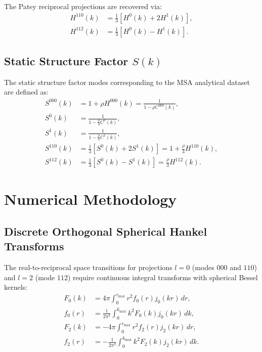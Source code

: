 \documentclass[11pt,a4paper]{article}
\begin{document}
The Patey reciprocal projections are recovered via:
\begin{align}
    H^{110}(k) &= \frac{1}{3} \left[ H^0(k) + 2 H^1(k) \right], \\
    H^{112}(k) &= \frac{1}{3} \left[ H^0(k) - H^1(k) \right].
\end{align}

\subsection{Static Structure Factor \texorpdfstring{$S(k)$}{S(k)}}

The static structure factor modes corresponding to the MSA analytical dataset are defined as:
\begin{align}
    S^{000}(k) &= 1 + \rho H^{000}(k) = \frac{1}{1 - \rho C^{000}(k)}, \\
    S^0(k)     &= \frac{1}{1 - \frac{\rho}{3} C^0(k)}, \\
    S^1(k)     &= \frac{1}{1 - \frac{\rho}{3} C^1(k)}, \\
    S^{110}(k) &= \frac{1}{3} \left[ S^0(k) + 2 S^1(k) \right] = 1 + \frac{\rho}{3} H^{110}(k), \\
    S^{112}(k) &= \frac{1}{3} \left[ S^0(k) - S^1(k) \right] = \frac{\rho}{3} H^{112}(k).
\end{align}

\section{Numerical Methodology}

\subsection{Discrete Orthogonal Spherical Hankel Transforms}

The real-to-reciprocal space transitions for projections $l=0$ (modes $000$ and $110$) and $l=2$ (mode $112$) require continuous integral transforms with spherical Bessel kernels:
\begin{align}
    F_0(k) &= 4\pi \int_0^{r_{\max}} r^2 f_0(r) j_0(kr) \, dr, \\
    f_0(r) &= \frac{1}{2\pi^2} \int_0^{k_{\max}} k^2 F_0(k) j_0(kr) \, dk, \\
    F_2(k) &= -4\pi \int_0^{r_{\max}} r^2 f_2(r) j_2(kr) \, dr, \\
    f_2(r) &= -\frac{1}{2\pi^2} \int_0^{k_{\max}} k^2 F_2(k) j_2(kr) \, dk.
\end{align}
\end{document}
